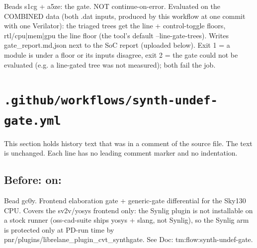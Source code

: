 \begin{record}
\begin{textblock}
Beads s1cg + a5ze: the gate.  NOT continue-on-error.  Evaluated on the COMBINED data (both
.dat inputs, produced by this workflow at one commit with one Verilator): the triaged trees get
the line + control-toggle floors, rtl/cpu|mem|gpu the line floor (the tool's default
--line-gate-trees).  Writes gate_report.{md,json} next to the SoC report (uploaded below).
Exit 1 = a module is under a floor or its inputs disagree, exit 2 = the gate could not be
evaluated (e.g. a line-gated tree was not measured); both fail the job.
\end{textblock}

\end{record}

\section{\texttt{.github/workflows/synth-undef-gate.yml}}\label{cr:flow:ci-synth-undef-gate}

This section holds history text that was in a comment of the source file. The text is unchanged. Each line has no leading comment marker and no indentation.

\begin{record}

\subsection*{Before: on:}

\begin{textblock}
Bead gc0y. Frontend elaboration gate + generic-gate differential for the Sky130 CPU.
Covers the sv2v/yosys frontend only: the Synlig plugin is not installable on a stock runner
(oss-cad-suite ships yosys + slang, not Synlig), so the Synlig arm is protected only at PD-run
time by pnr/plugins/librelane_plugin_cvt_synthgate. See Doc: tm:flow:synth-undef-gate.
\end{textblock}

\end{record}

